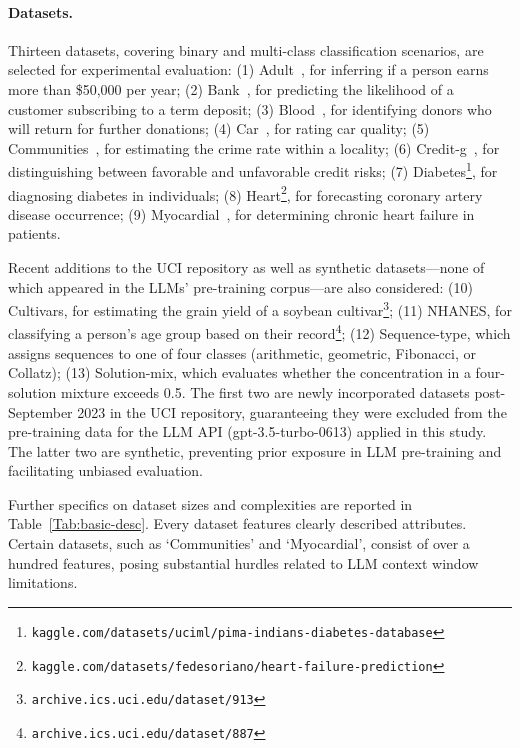 \paragraph{Datasets.}
Thirteen datasets, covering binary and multi-class classification scenarios, are selected for experimental evaluation: (1) Adult~\cite{asuncion2007uci}, for inferring if a person earns more than \$50,000 per year; (2) Bank~\cite{moro2014data}, for predicting the likelihood of a customer subscribing to a term deposit; (3) Blood~\cite{yeh2009knowledge}, for identifying donors who will return for further donations; (4) Car~\cite{kadra2021well}, for rating car quality; (5) Communities~\cite{misc_communities_and_crime_183}, for estimating the crime rate within a locality; (6) Credit-g~\cite{kadra2021well}, for distinguishing between favorable and unfavorable credit risks; (7) Diabetes\footnote{\texttt{kaggle.com/datasets/uciml/pima-indians-diabetes-database}}, for diagnosing diabetes in individuals; (8) Heart\footnote{\texttt{kaggle.com/datasets/fedesoriano/heart-failure-prediction}}, for forecasting coronary artery disease occurrence; (9) Myocardial~\cite{misc_myocardial_infarction_complications_579}, for determining chronic heart failure in patients.

Recent additions to the UCI repository as well as synthetic datasets—none of which appeared in the LLMs’ pre-training corpus—are also considered: (10) Cultivars, for estimating the grain yield of a soybean cultivar\footnote{\texttt{archive.ics.uci.edu/dataset/913}}; (11) NHANES, for classifying a person's age group based on their record\footnote{\texttt{archive.ics.uci.edu/dataset/887}}; (12) Sequence-type, which assigns sequences to one of four classes (arithmetic, geometric, Fibonacci, or Collatz); (13) Solution-mix, which evaluates whether the concentration in a four-solution mixture exceeds 0.5. The first two are newly incorporated datasets post-September 2023 in the UCI repository, guaranteeing they were excluded from the pre-training data for the LLM API (gpt-3.5-turbo-0613) applied in this study. The latter two are synthetic, preventing prior exposure in LLM pre-training and facilitating unbiased evaluation.

Further specifics on dataset sizes and complexities are reported in Table~\ref{Tab:basic-desc}.
Every dataset features clearly described attributes. Certain datasets, such as `Communities' and `Myocardial', consist of over a hundred features, posing substantial hurdles related to LLM context window limitations.


